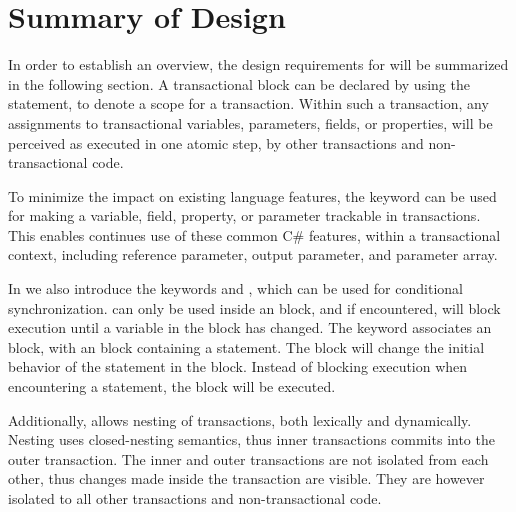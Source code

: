 \section{Summary of Design}
In order to establish an overview, the design requirements for \stmnamesp will be summarized in the following section. A transactional block can be declared by using the  statement, to denote a scope for a transaction. Within such a transaction, any assignments to transactional variables, parameters, fields, or properties, will be perceived as executed in one atomic step, by other transactions and non-transactional code. 

To minimize the impact on existing language features, the  keyword can be used for making a variable, field, property, or parameter trackable in transactions. This enables continues use of these common C\# features, within a transactional context, including reference parameter, output parameter, and parameter array.

In \stmnamesp we also introduce the keywords  and , which can be used for conditional synchronization.  can only be used inside an  block, and if encountered, will block execution until a variable in the  block has changed. The  keyword associates an  block, with an  block containing a  statement. The  block will change the initial behavior of the  statement in the  block. Instead of blocking execution when encountering a  statement, the  block will be executed.

Additionally, \stmnamesp allows nesting of transactions, both lexically and dynamically. Nesting uses closed-nesting semantics, thus inner transactions commits into the outer transaction. The inner and outer transactions are not isolated from each other, thus changes made inside the transaction are visible. They are however isolated to all other transactions and non-transactional code.


%
%
%
%    
%
%    
         
         



\worksheetend

